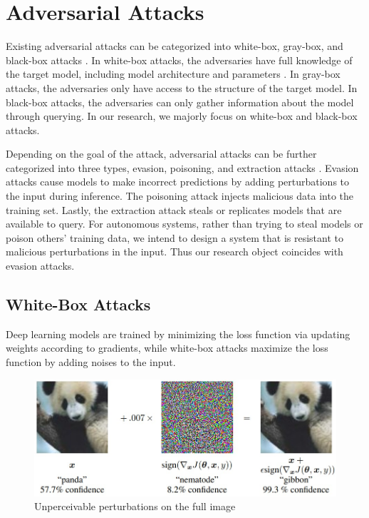 

\section{Adversarial Attacks}
\label{sec:adv_attack}

Existing adversarial attacks can be categorized into white-box, gray-box, and black-box attacks \citep{REN2020346}. In white-box attacks, the adversaries have full knowledge of the target model, including model architecture and parameters \citep{goodfellow2015explaining}. In gray-box attacks, the adversaries only have access to the structure of the target model. In black-box attacks, the adversaries can only gather information about the model through querying. In our research, we majorly focus on white-box and black-box attacks.

Depending on the goal of the attack, adversarial attacks can be further categorized into three types, evasion, poisoning, and extraction attacks \citep{art2018}. Evasion attacks cause models to make incorrect predictions by adding perturbations to the input during inference. The poisoning attack injects malicious data into the training set. Lastly, the extraction attack steals or replicates models that are available to query. For autonomous systems, rather than trying to steal models or poison others' training data, we intend to design a system that is resistant to malicious perturbations in the input. Thus our research object coincides with evasion attacks.

\subsection{White-Box Attacks}
\label{sec:whitebox_attack}

Deep learning models are trained by minimizing the loss function via updating weights according to gradients, while white-box attacks maximize the loss function by adding noises to the input.

\begin{figure}[H]
\centering
\includegraphics[scale=0.5]{figures/chapter_intro/fgsm.jpg}
\caption{Unperceivable perturbations on the full image}
\label{fig.adv_perturb}
\end{figure}

